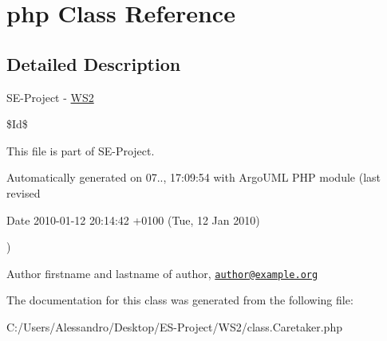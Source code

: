 \hypertarget{class_1_1_caretaker_1_1php}{\section{php Class Reference}
\label{class_1_1_caretaker_1_1php}
}


\subsection{Detailed Description}
S\+E-\/\+Project -\/ \hyperlink{namespace_w_s2}{W\+S2}

\$\+Id\$

This file is part of S\+E-\/\+Project.

Automatically generated on 07.., 17\+:09\+:54 with Argo\+U\+M\+L P\+H\+P module (last revised \begin{DoxyParagraph}{Date}
2010-\/01-\/12 20\+:14\+:42 +0100 (Tue, 12 Jan 2010) 
\end{DoxyParagraph}
)

\begin{DoxyAuthor}{Author}
firstname and lastname of author, \href{mailto:author@example.org}{\tt author@example.\+org} 
\end{DoxyAuthor}


The documentation for this class was generated from the following file\+:\begin{DoxyCompactItemize}
\item 
C\+:/\+Users/\+Alessandro/\+Desktop/\+E\+S-\/\+Project/\+W\+S2/class.\+Caretaker.\+php\end{DoxyCompactItemize}
